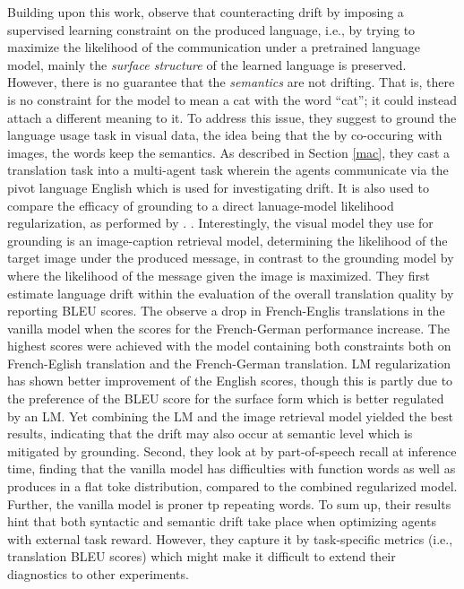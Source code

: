 Building upon this work, \cite{lee2019countering} observe that counteracting drift by imposing a supervised learning constraint on the produced language, i.e., by trying to maximize the likelihood of the communication under a pretrained language model, mainly the \textit{surface structure} of the learned language is preserved. However, there is no guarantee that the \textit{semantics} are not drifting. That is, there is no constraint for the model to mean a cat with the word ``cat''; it could instead attach a different meaning to it.  To address this issue, they suggest to ground the language usage task in visual data, the idea being that the by co-occuring with images, the words keep the semantics. As described in Section \ref{mac}, they cast a translation task into a multi-agent task wherein the agents communicate via the pivot language English which is used for investigating drift. It is also used to compare the efficacy of grounding to a direct lanuage-model likelihood regularization, as performed by \cite{lewis2017deal}. . Interestingly, the visual model they use for grounding is an image-caption retrieval model, determining the likelihood of the target image under the produced message, in  contrast to the grounding model by \cite{lazaridou2020emergent} where the likelihood of the message given the image is maximized.
They first estimate language drift within the evaluation of the overall translation quality by reporting BLEU scores. The observe a drop in French-Englis translations in the vanilla model when the scores for the French-German performance increase. The highest scores were achieved with the model containing both constraints both on French-Eglish translation and the French-German translation. LM regularization has shown better improvement of the English scores, though this is partly due to the preference of the BLEU score for the surface form which is better regulated by an LM. Yet combining the LM and the image retrieval model yielded the best results, indicating that the drift may also occur at semantic level which is mitigated by grounding. Second, they look at by part-of-speech recall at inference time, finding that the vanilla model has difficulties with function words as well as produces in a flat toke distribution, compared to the combined regularized model. Further, the vanilla model is proner tp repeating words. To sum up, their results hint that both syntactic and semantic drift take place when optimizing agents with external task reward. However, they capture it by task-specific metrics (i.e., translation BLEU scores) which might make it difficult to extend their diagnostics to other experiments.

